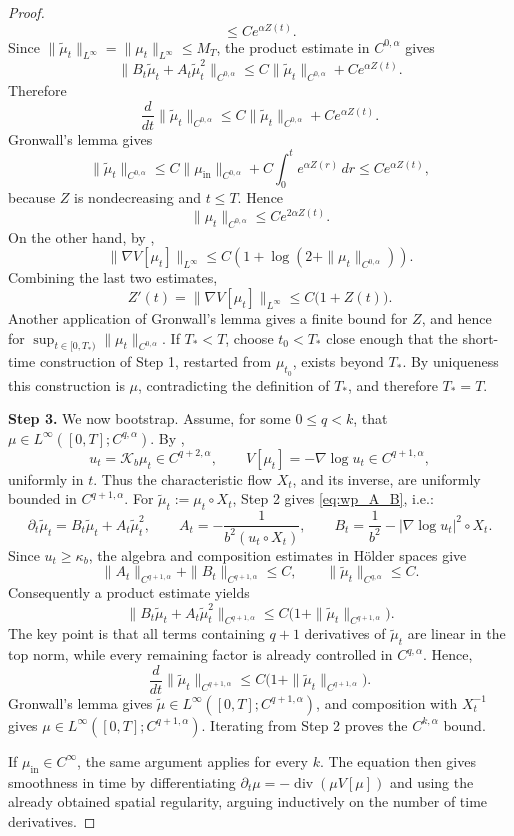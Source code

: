 \documentclass[11pt]{article}
\theoremstyle{definition}
\newcommand{\divg}{\operatorname{div}}
\begin{document}
\begin{proof}
\[\le Ce^{\alpha Z(t)} .
\]
Since \(\|\tilde\mu_t\|_{L^\infty}=\|\mu_t\|_{L^\infty}\le M_T\), the product
estimate in \(C^{0,\alpha}\) gives
\[
\|B_t\tilde\mu_t+A_t\tilde\mu_t^2\|_{C^{0,\alpha}}
\le
C\|\tilde\mu_t\|_{C^{0,\alpha}}+Ce^{\alpha Z(t)} .
\]
Therefore
\[
\frac{d}{dt}\|\tilde\mu_t\|_{C^{0,\alpha}}
\le
C\|\tilde\mu_t\|_{C^{0,\alpha}}+Ce^{\alpha Z(t)} .
\]
Gronwall's lemma gives
\[
\|\tilde\mu_t\|_{C^{0,\alpha}}
\le
C\|\mu_{\mathrm{in}}\|_{C^{0,\alpha}}
+C\int_0^t e^{\alpha Z(r)}\,dr
\le Ce^{\alpha Z(t)},
\]
because \(Z\) is nondecreasing and \(t\le T\). Hence
\[
\|\mu_t\|_{C^{0,\alpha}}
\le Ce^{2\alpha Z(t)} .
\]
On the other hand, by ,
\[
\|\nabla V[\mu_t]\|_{L^\infty}
\le
C\left(1+\log(2+\|\mu_t\|_{C^{0,\alpha}})\right).
\]
Combining the last two estimates,
\[
Z'(t)=\|\nabla V[\mu_t]\|_{L^\infty}
\le C\bigl(1+Z(t)\bigr).
\]
Another application of Gronwall's lemma gives a finite bound for \(Z\), and
hence for \(\sup_{t\in[0,T_\ast)}\|\mu_t\|_{C^{0,\alpha}}\). If
\(T_\ast<T\), choose \(t_0<T_\ast\) close enough that the short-time
construction of Step 1, restarted from \(\mu_{t_0}\), exists beyond
\(T_\ast\). By uniqueness this construction is \(\mu\), contradicting the
definition of \(T_\ast\), and therefore \(T_\ast=T\).

\smallskip
\noindent\textbf{Step 3.}
We now bootstrap.  Assume, for some \(0\le q<k\), that
\(\mu\in L^\infty([0,T];C^{q,\alpha})\).  By
,
\[
u_t=\mathcal K_b\mu_t\in C^{q+2,\alpha},
\qquad
V[\mu_t]=-\nabla\log u_t\in C^{q+1,\alpha},
\]
uniformly in \(t\).  Thus the characteristic flow \(X_t\), and its inverse,
are uniformly bounded in \(C^{q+1,\alpha}\).  For
\(\tilde\mu_t:=\mu_t\circ X_t\), Step 2 gives \eqref{eq:wp_A_B}, i.e.:
\[
\partial_t\tilde\mu_t=B_t\tilde\mu_t+A_t\tilde\mu_t^2,
\qquad
A_t=-\frac1{b^2(u_t\circ X_t)},\qquad
B_t=\frac1{b^2}-|\nabla\log u_t|^2\circ X_t .
\]
Since \(u_t\ge\kappa_b\), the algebra and composition estimates in Hölder
spaces give
\[
\|A_t\|_{C^{q+1,\alpha}}+\|B_t\|_{C^{q+1,\alpha}}\le C,
\qquad
\|\tilde\mu_t\|_{C^{q,\alpha}}\le C .
\]
Consequently a product estimate yields
\[
\|B_t\tilde\mu_t+A_t\tilde\mu_t^2\|_{C^{q+1,\alpha}}
\le C\bigl(1+\|\tilde\mu_t\|_{C^{q+1,\alpha}}\bigr).
\]
The key point is that all terms containing \(q+1\) derivatives of
\(\tilde\mu_t\) are linear in the top norm, while every remaining factor is already
controlled in \(C^{q,\alpha}\).  Hence,
\[
\frac{d}{dt}\|\tilde\mu_t\|_{C^{q+1,\alpha}}
\le C\bigl(1+\|\tilde\mu_t\|_{C^{q+1,\alpha}}\bigr).
\]
Gronwall's lemma gives
\(\tilde\mu\in L^\infty([0,T];C^{q+1,\alpha})\), and composition with
\(X_t^{-1}\) gives
\(\mu\in L^\infty([0,T];C^{q+1,\alpha})\).  Iterating from Step 2 proves the
\(C^{k,\alpha}\) bound.

If \(\mu_{\mathrm{in}}\in C^\infty\), the same argument applies for every \(k\).  The
equation then gives smoothness in time by differentiating
\(\partial_t\mu=-\divg(\mu V[\mu])\) and using the already obtained spatial
regularity, arguing inductively on the number of time derivatives.
\end{proof}
\end{document}
